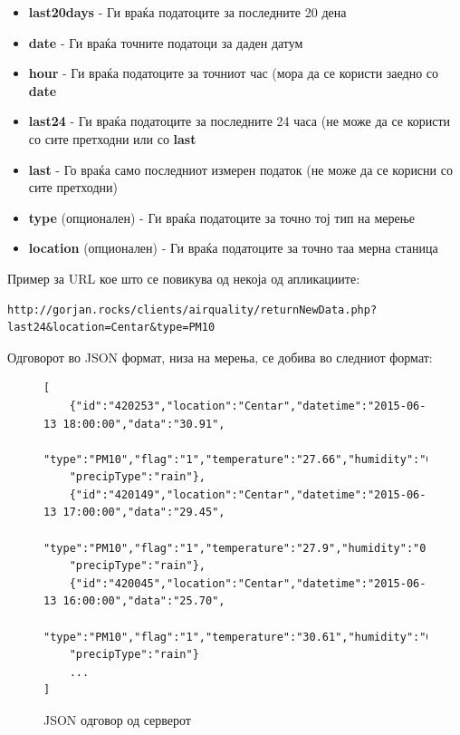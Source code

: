 \documentclass{uvamscse}
\begin{document}
\begin{itemize}
\item \textbf{last20days} - Ги враќа податоците за последните 20 дена
\item \textbf{date} - Ги враќа точните податоци за даден датум
\item \textbf{hour} - Ги враќа податоците за точниот час (мора да се користи заедно со \textbf{date}
\item \textbf{last24} - Ги враќа податоците за последните 24 часа (не може да се користи со сите претходни или со \textbf{last}
\item \textbf{last} - Го враќа само последниот измерен податок (не може да се корисни со сите претходни)
\item \textbf{type} (опционален) - Ги враќа податоците за точно тој тип на мерење
\item \textbf{location} (опционален) - Ги враќа податоците за точно таа мерна станица
\end{itemize}
\vspace{5mm}

Пример за URL кое што се повикува од некоја од апликациите:
\vspace{5mm}

\begin{snippet}
\begin{verbatim}
http://gorjan.rocks/clients/airquality/returnNewData.php?last24&location=Centar&type=PM10
\end{verbatim}
\end{snippet}
\vspace{5mm}


Одговорот во JSON формат, низа на мерења, се добива во следниот формат:


\begin{figure}[H]
\centering
\begin{snippet}
\begin{verbatim}
[
    {"id":"420253","location":"Centar","datetime":"2015-06-13 18:00:00","data":"30.91",
    "type":"PM10","flag":"1","temperature":"27.66","humidity":"0.3","windSpeed":"1.01",
    "precipType":"rain"},
    {"id":"420149","location":"Centar","datetime":"2015-06-13 17:00:00","data":"29.45",
    "type":"PM10","flag":"1","temperature":"27.9","humidity":"0.35","windSpeed":"0.97",
    "precipType":"rain"},
    {"id":"420045","location":"Centar","datetime":"2015-06-13 16:00:00","data":"25.70",
    "type":"PM10","flag":"1","temperature":"30.61","humidity":"0.29","windSpeed":"0.64",
    "precipType":"rain"}
    ...
]
\end{verbatim}
\end{snippet}
\caption{JSON одговор од серверот}
\label{fig:jsonPodatociOdgovor}
\end{figure}
\end{document}
